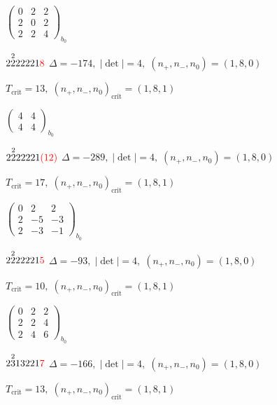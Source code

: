\documentclass[10pt]{article}
\begin{document}
\hspace{2em}$\left(\begin{smallmatrix}0 & 2 & 2 \\ 2 & 0 & 2 \\ 2 & 2 & 4\end{smallmatrix}\right)_{\!b_0}$

$2\overset{2}{2}22221\textcolor{red}{8}$ \quad $\Delta=-174,\; |\det|=4,\; (n_+,n_-,n_0)=(1,8,0)$

\hspace{1em}$T_{\text{crit}}=13,\; (n_+,n_-,n_0)_{\text{crit}}=(1,8,1)$

\hspace{2em}$\left(\begin{smallmatrix}4 & 4 \\ 4 & 4\end{smallmatrix}\right)_{\!b_0}$

$2\overset{2}{2}22221\textcolor{red}{(12)}$ \quad $\Delta=-289,\; |\det|=4,\; (n_+,n_-,n_0)=(1,8,0)$

\hspace{1em}$T_{\text{crit}}=17,\; (n_+,n_-,n_0)_{\text{crit}}=(1,8,1)$

\hspace{2em}$\left(\begin{smallmatrix}0 & 2 & 2 \\ 2 & -5 & -3 \\ 2 & -3 & -1\end{smallmatrix}\right)_{\!b_0}$

$2\overset{2}{2}22221\textcolor{red}{5}$ \quad $\Delta=-93,\; |\det|=4,\; (n_+,n_-,n_0)=(1,8,0)$

\hspace{1em}$T_{\text{crit}}=10,\; (n_+,n_-,n_0)_{\text{crit}}=(1,8,1)$

\hspace{2em}$\left(\begin{smallmatrix}0 & 2 & 2 \\ 2 & 2 & 4 \\ 2 & 4 & 6\end{smallmatrix}\right)_{\!b_0}$

\smallskip

$2\overset{2}{3}13221\textcolor{red}{7}$ \quad $\Delta=-166,\; |\det|=4,\; (n_+,n_-,n_0)=(1,8,0)$

\hspace{1em}$T_{\text{crit}}=13,\; (n_+,n_-,n_0)_{\text{crit}}=(1,8,1)$
\end{document}
